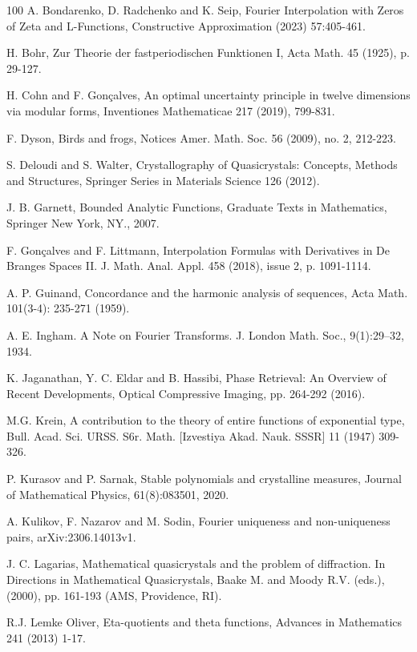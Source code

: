 \documentclass[a4paper,reqno,12pt]{amsart}
\newcommand{\1}{{\bf 1}}
\renewcommand{\1}{{\bo 1}}
\begin{document}
\begin{thebibliography}{100}
A. Bondarenko, D. Radchenko and K. Seip,
Fourier Interpolation with Zeros of Zeta and L-Functions,
Constructive Approximation (2023) 57:405-461.

H. Bohr, Zur Theorie der fastperiodischen Funktionen I, Acta Math. 45 (1925), p. 29-127.

H. Cohn and F. Gon\c{c}alves,
An optimal uncertainty principle in twelve dimensions via modular forms,
Inventiones Mathematicae 217 (2019), 799-831.

F. Dyson, Birds and frogs, Notices Amer. Math. Soc. 56 (2009), no. 2, 212-223.

S. Deloudi and S. Walter, Crystallography of Quasicrystals: Concepts, Methods and Structures, Springer Series in Materials Science 126 (2012).

J. B. Garnett, Bounded Analytic Functions, Graduate Texts in Mathematics, Springer New York, NY., 2007.

F. Gonçalves and F. Littmann,
Interpolation Formulas with Derivatives in De Branges Spaces II. J. Math. Anal. Appl. 458 (2018), issue 2, p. 1091-1114.


A. P. Guinand, Concordance and the harmonic analysis of sequences, Acta Math. 101(3-4): 235-271 (1959).


A. E. Ingham. A Note on Fourier Transforms. J. London Math. Soc., 9(1):29–32, 1934.

K. Jaganathan, Y. C. Eldar and B. Hassibi,
Phase Retrieval: An Overview of Recent Developments,
Optical Compressive Imaging, pp. 264-292 (2016).

M.G. Krein, A contribution to the theory of entire functions of exponential type, Bull. Acad. Sci. URSS. S6r. Math. [Izvestiya Akad. Nauk. SSSR] 11 (1947) 309-326.



P. Kurasov and P. Sarnak, Stable polynomials and crystalline measures, Journal of Mathematical Physics, 61(8):083501, 2020.

A. Kulikov, F. Nazarov and M. Sodin,
Fourier uniqueness and non-uniqueness pairs, arXiv:2306.14013v1.

J. C. Lagarias, Mathematical quasicrystals and the problem of diffraction. In Directions in Mathematical Quasicrystals, Baake M. and Moody R.V. (eds.), (2000), pp. 161-193 (AMS, Providence, RI).

R.J. Lemke Oliver, 
Eta-quotients and theta functions,
Advances in Mathematics 241 (2013) 1-17.


\end{thebibliography}
\end{document}
